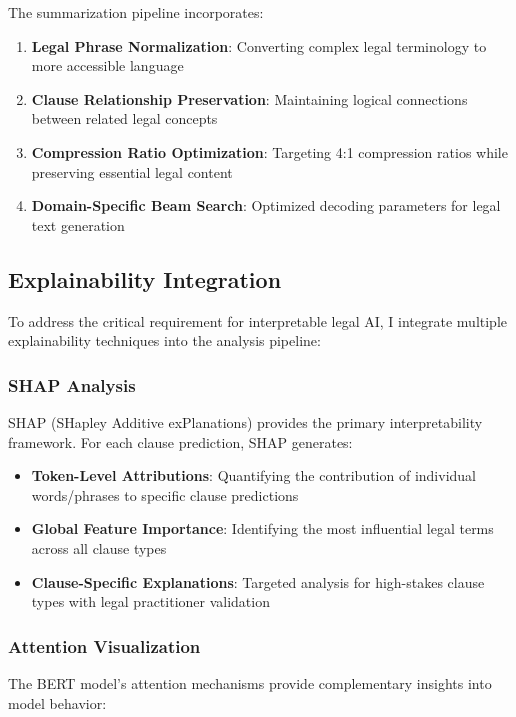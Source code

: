 The summarization pipeline incorporates:

\begin{enumerate}
    \item \textbf{Legal Phrase Normalization}: Converting complex legal terminology to more accessible language
    \item \textbf{Clause Relationship Preservation}: Maintaining logical connections between related legal concepts
    \item \textbf{Compression Ratio Optimization}: Targeting 4:1 compression ratios while preserving essential legal content
    \item \textbf{Domain-Specific Beam Search}: Optimized decoding parameters for legal text generation
\end{enumerate}

\subsection{Explainability Integration}

To address the critical requirement for interpretable legal AI, I integrate multiple explainability techniques into the analysis pipeline:

\subsubsection{SHAP Analysis}

SHAP (SHapley Additive exPlanations) \cite{lundberg2017unified} provides the primary interpretability framework. For each clause prediction, SHAP generates:

\begin{itemize}
    \item \textbf{Token-Level Attributions}: Quantifying the contribution of individual words/phrases to specific clause predictions
    \item \textbf{Global Feature Importance}: Identifying the most influential legal terms across all clause types
    \item \textbf{Clause-Specific Explanations}: Targeted analysis for high-stakes clause types with legal practitioner validation
\end{itemize}

\subsubsection{Attention Visualization}

The BERT model's attention mechanisms provide complementary insights into model behavior:

